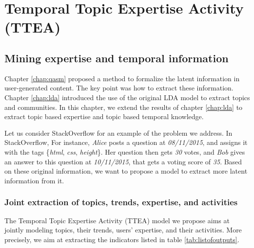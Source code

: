 \chapter{Temporal Topic Expertise Activity (TTEA)}
\doublespacing
\label{chap:ttea}
\minitoc




\section{Mining expertise and temporal information}

Chapter \ref{chap:qasm} proposed a method to formalize the latent information in user-generated content. The key point was how to extract these information. Chapter \ref{chap:lda} introduced the use of the original LDA model to extract topics and communities. In this chapter, we extend the results of chapter \ref{chap:lda} to extract topic based expertise and topic based temporal knowledge.

Let us consider StackOverflow for an example of the problem we address. In StackOverflow, For instance, \textit{Alice} posts a question at \textit{08/11/2015}, and assigns it with the tags \{\textit{html}, \textit{css}, \textit{height}\}. Her question then gets \textit{30} votes, and \textit{Bob} gives an answer to this question at \textit{10/11/2015}, that gets a voting score of \textit{35}. Based on these original information, we want to propose a model to extract more latent information from it.

\subsection{Joint extraction of topics, trends, expertise, and activities}
The Temporal Topic Expertise Activity (TTEA) model we propose aims at jointly modeling topics, their trends, users' expertise, and their activities. 
More precisely, we aim at extracting the indicators listed in table \ref{tab:listofoutputs}. 

